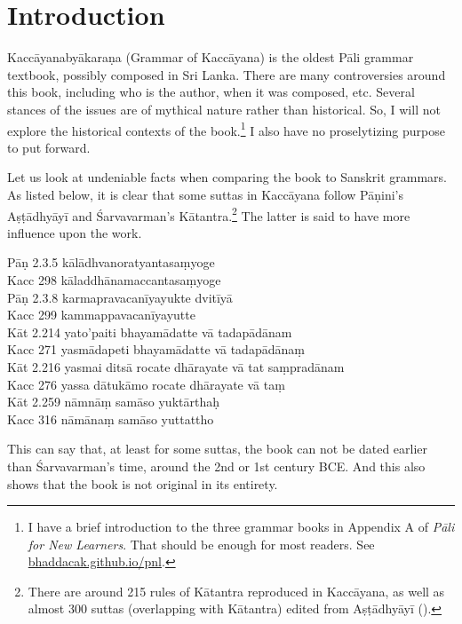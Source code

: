 \cleardoublepage
{}
{}
\setcounter{footnote}{0}
\chapter*{Introduction}

Kaccāyanabyākaraṇa (Grammar of Kaccāyana) is the oldest Pāli grammar textbook, possibly composed in Sri Lanka. There are many controversies around this book, including who is the author, when it was composed, etc. Several stances of the issues are of mythical nature rather than historical. So, I will not explore the historical contexts of the book.\footnote{I have a brief introduction to the three grammar books in Appendix A of \emph{Pāli for New Learners}. That should be enough for most readers. See \url{bhaddacak.github.io/pnl}.} I also have no proselytizing purpose to put forward.

Let us look at undeniable facts when comparing the book to Sanskrit grammars. As listed below, it is clear that some suttas in Kaccāyana follow Pāṇini's Aṣṭādhyāyī and Śarvavarman's Kātantra.\footnote{There are around 215 rules of Kātantra reproduced in Kaccāyana, as well as almost 300 suttas (overlapping with Kātantra) edited from Aṣṭādhyāyī (\citealp[p.~79]{pind:survey}).} The latter is said to have more influence upon the work.

\bigskip
{\small\noindent
Pāṇ 2.3.5 kālādhvanoratyantasaṃyoge\\
Kacc 298 kāladdhānamaccantasaṃyoge\\[1mm]
Pāṇ 2.3.8 karmapravacanīyayukte dvitīyā\\
Kacc 299 kammappavacanīyayutte\\[1mm]
Kāt 2.214 yato'paiti bhayamādatte vā tadapādānam\\
Kacc 271 yasmādapeti bhayamādatte vā tadapādānaṃ\\[1mm]
Kāt 2.216 yasmai ditsā rocate dhārayate vā tat saṃpradānam\\
Kacc 276 yassa dātukāmo rocate dhārayate vā taṃ\\[1mm]
Kāt 2.259 nāmnāṃ samāso yuktārthaḥ\\
Kacc 316 nāmānaṃ samāso yuttattho\\
}

This can say that, at least for some suttas, the book can not be dated earlier than Śarvavarman's time, around the 2nd or 1st century BCE. And this also shows that the book is not original in its entirety.

